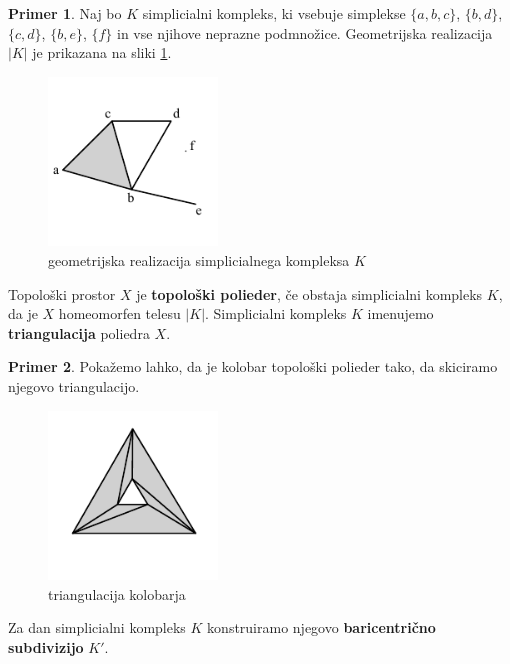 \documentclass[a4paper, 12pt]{book}
\theoremstyle{definition}
\newtheorem{example}{Primer}[section]
\theoremstyle{remark}
\begin{document}
\begin{example}
  Naj bo $K$ simplicialni kompleks, ki vsebuje simplekse
  $\{a,b,c\}$, $\{b,d\}$, $\{c,d\}$, $\{b,e\}$, $\{f\}$ in vse njihove neprazne
  podmnožice.
  Geometrijska realizacija $|K|$ je prikazana na sliki \ref{sx}.
  \begin{figure}[h]
      \begin{center}
      \includegraphics[width=0.4\textwidth]{simplicialni-kompleks.pdf}
      \end{center}
      \caption{geometrijska realizacija simplicialnega kompleksa $K$}
      \label{sx}
  \end{figure}
\end{example}
\newpage
Topološki prostor $X$ je \textbf{topološki polieder}, če obstaja simplicialni
kompleks $K$, da je $X$ homeomorfen telesu $|K|$. Simplicialni kompleks
$K$ imenujemo \textbf{triangulacija} poliedra $X$.
\begin{example}
  Pokažemo lahko, da je kolobar topološki polieder tako, da skiciramo njegovo
  triangulacijo.
    \begin{figure}[h]
        \begin{center}
        \includegraphics[width=0.4\textwidth]{torus-simpleks.pdf}
        \end{center}
        \caption{triangulacija kolobarja}
    \end{figure}
\end{example}
Za dan simplicialni kompleks $K$ konstruiramo njegovo \textbf{baricentrično subdivizijo} $K'$.
\end{document}
